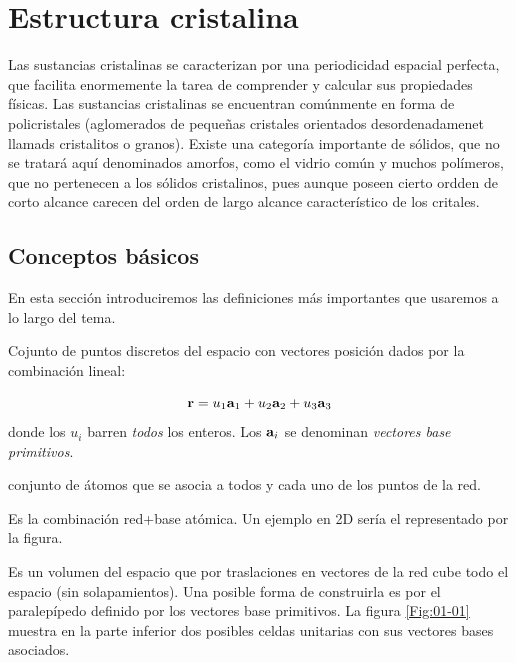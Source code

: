 \chapter{Estructura cristalina} \label{Ch:01}

Las sustancias cristalinas se caracterizan por una periodicidad espacial perfecta, que facilita enormemente la tarea de comprender y calcular sus propiedades físicas. Las sustancias cristalinas se encuentran comúnmente en forma de policristales (aglomerados de pequeñas cristales orientados desordenadamenet llamads cristalitos o granos). Existe una categoría importante de sólidos, que no se tratará aquí denominados amorfos, como el vidrio común  y muchos polímeros, que no pertenecen a los sólidos cristalinos, pues aunque poseen cierto ordden de corto alcance carecen del orden de largo alcance característico de los critales.

\section{Conceptos básicos}

En esta sección introduciremos las definiciones más importantes que usaremos a lo largo del tema. \\

\begin{definition}[{\bf Red}]
    Cojunto de puntos discretos del espacio con vectores posición dados por la combinación lineal: 

    \begin{equation}
        \mathbf{r} = u_1 \mathbf{a}_1 + u_2 \mathbf{a}_2 + u_3 \mathbf{a}_3 \label{Ec:01-01-01}
    \end{equation}
    donde los $u_i$ barren {\it todos} los enteros. Los $\mathbf{a}_i$ se denominan {\it vectores base primitivos}.
\end{definition}

\begin{definition}
    conjunto de átomos que se asocia a todos y cada uno de los puntos de la red.
\end{definition}

\begin{definition}
    Es la combinación red+base atómica. Un ejemplo en 2D sería el representado por la figura.
\end{definition}

\begin{definition}
    Es un volumen del espacio que por traslaciones en vectores de la red cube todo el espacio (sin solapamientos). Una posible forma de construirla es por el paralepípedo definido por los vectores base primitivos. La figura \ref{Fig:01-01} muestra en la parte inferior dos posibles celdas unitarias con sus vectores bases asociados.   
\end{definition}

